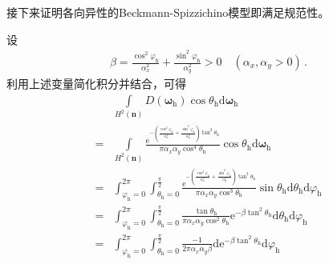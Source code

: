 接下来证明各向异性的Beckmann-Spizzichino模型即满足规范性。
\begin{prove}
    设
    \begin{align}\label{eq:8.ex-03}
        \beta=\frac{\cos^2\varphi_{\mathrm{h}}}{\alpha_x^2}+\frac{\sin^2\varphi_{\mathrm{h}}}{\alpha_y^2}>0\quad(\alpha_x,\alpha_y>0)\, .
    \end{align}
    利用上述变量简化积分并结合，可得
    \begin{align}
          & \int\limits_{H^2({\bm n})}D({\bm\omega}_{\mathrm{h}})\cos\theta_{\mathrm{h}}\mathrm{d}{\bm\omega}_{\mathrm{h}}\nonumber                                                                                                                                                                                                                                                         \\
        = & \int\limits_{H^2({\bm n})}\frac{\mathrm{e}^{-\left(\frac{\cos^2\varphi_{\mathrm{h}}}{\alpha_x^2}+\frac{\sin^2\varphi_{\mathrm{h}}}{\alpha_y^2}\right)\tan^2\theta_{\mathrm{h}}}}{\pi\alpha_x\alpha_y\cos^4\theta_{\mathrm{h}}}\cos\theta_{\mathrm{h}}\mathrm{d}{\bm\omega}_{\mathrm{h}}\nonumber                                                                                \\
        = & \int_{\varphi_{\mathrm{h}}=0}^{2\pi}\int_{\theta_{\mathrm{h}}=0}^{\frac{\pi}{2}}\frac{\mathrm{e}^{-\left(\frac{\cos^2\varphi_{\mathrm{h}}}{\alpha_x^2}+\frac{\sin^2\varphi_{\mathrm{h}}}{\alpha_y^2}\right)\tan^2\theta_{\mathrm{h}}}}{\pi\alpha_x\alpha_y\cos^3\theta_{\mathrm{h}}}\sin\theta_{\mathrm{h}}\mathrm{d}\theta_{\mathrm{h}}\mathrm{d}\varphi_{\mathrm{h}}\nonumber \\
        = & \int_{\varphi_{\mathrm{h}}=0}^{2\pi}\int_{\theta_{\mathrm{h}}=0}^{\frac{\pi}{2}}\frac{\tan\theta_{\mathrm{h}}}{\pi\alpha_x\alpha_y\cos^2\theta_{\mathrm{h}}}\mathrm{e}^{-\beta \tan^2\theta_{\mathrm{h}}}\mathrm{d}\theta_{\mathrm{h}}\mathrm{d}\varphi_{\mathrm{h}}\nonumber                                                                                                   \\
        = & \int_{\varphi_{\mathrm{h}}=0}^{2\pi}\int_{\theta_{\mathrm{h}}=0}^{\frac{\pi}{2}}\frac{-1}{2\pi\alpha_x\alpha_y\beta}\mathrm{d}\mathrm{e}^{-\beta \tan^2\theta_{\mathrm{h}}}\mathrm{d}\varphi_{\mathrm{h}}\nonumber                                                                                                                                                              \\

\end{align}
\end{prove}
